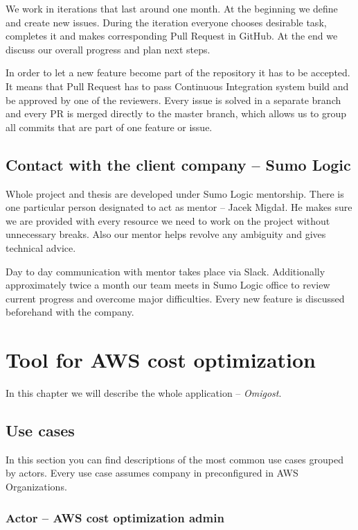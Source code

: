 \documentclass[licencjacka,en]{thesisclass}
\begin{document}
    We work in iterations that last around one month.
    At the beginning we define and create new issues.
    During the iteration everyone chooses desirable task, completes it and makes corresponding Pull Request in GitHub.
    At the end we discuss our overall progress and plan next steps.

    In order to let a new feature become part of the repository it has to be accepted.
    It means that Pull Request has to pass Continuous Integration system build and be approved by one of the reviewers.
    Every issue is solved in a separate branch and every PR is merged directly to the master branch, which allows us to group all commits that are part of one feature or issue.

    \section{Contact with the client company -- Sumo Logic}

    Whole project and thesis are developed under Sumo Logic mentorship.
    There is one particular person designated to act as mentor -- Jacek Migdał.
    He makes sure we are provided with every resource we need to
    work on the project without unnecessary breaks.
    Also our mentor helps revolve any ambiguity and gives technical advice.

    Day to day communication with mentor takes place via Slack.
    Additionally approximately twice a month our team meets in Sumo Logic office to review current progress and overcome major difficulties.
    Every new feature is discussed beforehand with the company.

    \chapter{Tool for AWS cost optimization}

    In this chapter we will describe the whole application -- \textit{Omigost}.

    \section{Use cases}

    In this section you can find descriptions of the most common use cases
    grouped by actors. Every use case assumes company in preconfigured in
    AWS Organizations.

    \subsection{Actor -- AWS cost optimization admin}
\end{document}

